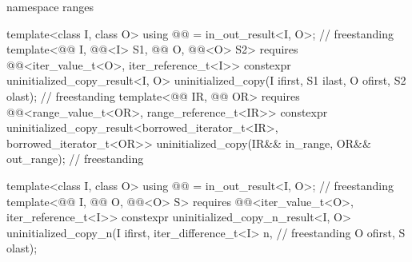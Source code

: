 \begin{codeblock}
{  namespace ranges {
    template<class I, class O>
      using @@ = in_out_result<I, O>;                        // freestanding
    template<@@ I, @@<I> S1,
             @@ O, @@<O> S2>
      requires @@<iter_value_t<O>, iter_reference_t<I>>
        constexpr uninitialized_copy_result<I, O>
          uninitialized_copy(I ifirst, S1 ilast, O ofirst, S2 olast);               // freestanding
    template<@@ IR, @@ OR>
      requires @@<range_value_t<OR>, range_reference_t<IR>>
        constexpr uninitialized_copy_result<borrowed_iterator_t<IR>, borrowed_iterator_t<OR>>
          uninitialized_copy(IR&& in_range, OR&& out_range);                        // freestanding

    template<class I, class O>
      using @@ = in_out_result<I, O>;                      // freestanding
    template<@@ I, @@ O, @@<O> S>
      requires @@<iter_value_t<O>, iter_reference_t<I>>
        constexpr uninitialized_copy_n_result<I, O>
          uninitialized_copy_n(I ifirst, iter_difference_t<I> n,                    // freestanding
                               O ofirst, S olast);

}}
\end{codeblock}
